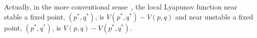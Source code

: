 \documentclass[
 pre,
 aps,
 a4paper,
 english,
 showkeys,
 reprint,
 twocolumn,
 superscriptaddress
]{revtex4}
\begin{document}
Actually, in the more conventional sense~\cite{jordan2007oxford}, the local Lyapunov function near stable a fixed point, $(p^*,q^*)$, is $V(p^*,q^*)-V(p,q)$ and near unstable a fixed point, $(p^*,q^*)$, is $V(p,q)-V(p^*,q^*)$.
\end{document}
